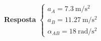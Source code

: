 \begin{flushright}
	\textbf{Resposta}
	$
	\begin{cases}
	a_{A}=\SI{7.3}{\meter/\second^{2}}\\
	a_{B}=\SI{11.27}{\meter/\second^{2}}\\
	\alpha_{AB}=\SI{18}{\radian/\second^{2}}
	\end{cases}
	$
\end{flushright}